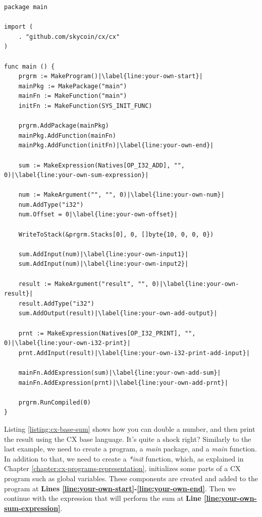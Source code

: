 \documentclass[11pt,fleqn,openany]{book} %
\begin{document}
\begin{lstlisting}[caption={Summing 10 + 10 using CX base language},captionpos=b,label={listing:cx-base-sum}]
package main

import (
	. "github.com/skycoin/cx/cx"
)

func main () {
	prgrm := MakeProgram()|\label{line:your-own-start}|
	mainPkg := MakePackage("main")
	mainFn := MakeFunction("main")
	initFn := MakeFunction(SYS_INIT_FUNC)

	prgrm.AddPackage(mainPkg)
	mainPkg.AddFunction(mainFn)
	mainPkg.AddFunction(initFn)|\label{line:your-own-end}|

	sum := MakeExpression(Natives[OP_I32_ADD], "", 0)|\label{line:your-own-sum-expression}|

	num := MakeArgument("", "", 0)|\label{line:your-own-num}|
	num.AddType("i32")
    num.Offset = 0|\label{line:your-own-offset}|

	WriteToStack(&prgrm.Stacks[0], 0, []byte{10, 0, 0, 0})

	sum.AddInput(num)|\label{line:your-own-input1}|
	sum.AddInput(num)|\label{line:your-own-input2}|

	result := MakeArgument("result", "", 0)|\label{line:your-own-result}|
	result.AddType("i32")
	sum.AddOutput(result)|\label{line:your-own-add-output}|
	
	prnt := MakeExpression(Natives[OP_I32_PRINT], "", 0)|\label{line:your-own-i32-print}|
	prnt.AddInput(result)|\label{line:your-own-i32-print-add-input}|

	mainFn.AddExpression(sum)|\label{line:your-own-add-sum}|
	mainFn.AddExpression(prnt)|\label{line:your-own-add-prnt}|

	prgrm.RunCompiled(0)
}
\end{lstlisting}

Listing \ref{listing:cx-base-sum} shows how you can double a number, and then print the result using the CX base language. It's quite a shock right? Similarly to the last example, we need to create a program, a \emph{main} package, and a \emph{main} function. In addition to that, we need to create a \emph{*init} function, which, as explained in Chapter \ref{chapter:cx-programs-representation}, initializes some parts of a CX program such as global variables. These components are created and added to the program at \textbf{Lines \ref{line:your-own-start}-\ref{line:your-own-end}}. Then we continue with the expression that will perform the sum at \textbf{Line \ref{line:your-own-sum-expression}}.
\end{document}
